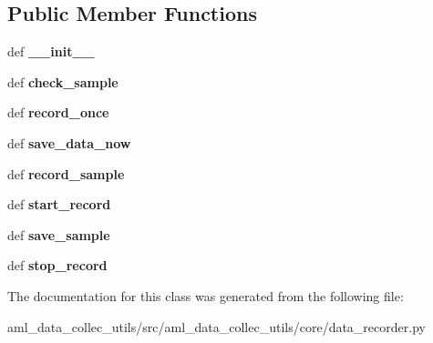 \subsection*{Public Member Functions}
\begin{DoxyCompactItemize}
\item 
\hypertarget{classaml__data__collec__utils_1_1core_1_1data__recorder_1_1_data_recorder_af30fc89a11eb8f23797d2bc65986e02f}{def {\bfseries \-\_\-\-\_\-init\-\_\-\-\_\-}}\label{classaml__data__collec__utils_1_1core_1_1data__recorder_1_1_data_recorder_af30fc89a11eb8f23797d2bc65986e02f}

\item 
\hypertarget{classaml__data__collec__utils_1_1core_1_1data__recorder_1_1_data_recorder_ac8c97876fbc9ba1f5d386425692350f8}{def {\bfseries check\-\_\-sample}}\label{classaml__data__collec__utils_1_1core_1_1data__recorder_1_1_data_recorder_ac8c97876fbc9ba1f5d386425692350f8}

\item 
\hypertarget{classaml__data__collec__utils_1_1core_1_1data__recorder_1_1_data_recorder_a0657028709128be59ca90df23e9a1a9d}{def {\bfseries record\-\_\-once}}\label{classaml__data__collec__utils_1_1core_1_1data__recorder_1_1_data_recorder_a0657028709128be59ca90df23e9a1a9d}

\item 
\hypertarget{classaml__data__collec__utils_1_1core_1_1data__recorder_1_1_data_recorder_a2f2398422b0f75510801188164971882}{def {\bfseries save\-\_\-data\-\_\-now}}\label{classaml__data__collec__utils_1_1core_1_1data__recorder_1_1_data_recorder_a2f2398422b0f75510801188164971882}

\item 
\hypertarget{classaml__data__collec__utils_1_1core_1_1data__recorder_1_1_data_recorder_a40ed019eb5117361ecfb769528a72968}{def {\bfseries record\-\_\-sample}}\label{classaml__data__collec__utils_1_1core_1_1data__recorder_1_1_data_recorder_a40ed019eb5117361ecfb769528a72968}

\item 
\hypertarget{classaml__data__collec__utils_1_1core_1_1data__recorder_1_1_data_recorder_acc481956358b64a8038370f5a8fc9f49}{def {\bfseries start\-\_\-record}}\label{classaml__data__collec__utils_1_1core_1_1data__recorder_1_1_data_recorder_acc481956358b64a8038370f5a8fc9f49}

\item 
\hypertarget{classaml__data__collec__utils_1_1core_1_1data__recorder_1_1_data_recorder_a4bf0d2565d7bf39b7bdd3acc08dd1057}{def {\bfseries save\-\_\-sample}}\label{classaml__data__collec__utils_1_1core_1_1data__recorder_1_1_data_recorder_a4bf0d2565d7bf39b7bdd3acc08dd1057}

\item 
\hypertarget{classaml__data__collec__utils_1_1core_1_1data__recorder_1_1_data_recorder_ad56cbcc53fc7fee273c87e627b3d3f8c}{def {\bfseries stop\-\_\-record}}\label{classaml__data__collec__utils_1_1core_1_1data__recorder_1_1_data_recorder_ad56cbcc53fc7fee273c87e627b3d3f8c}

\end{DoxyCompactItemize}


The documentation for this class was generated from the following file\-:\begin{DoxyCompactItemize}
\item 
aml\-\_\-data\-\_\-collec\-\_\-utils/src/aml\-\_\-data\-\_\-collec\-\_\-utils/core/data\-\_\-recorder.\-py\end{DoxyCompactItemize}
